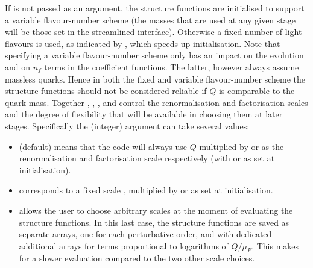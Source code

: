 If  is not passed as an argument, the structure functions
are initialised to support a variable flavour-number scheme (the
masses that are used at any given stage will be those set in the
streamlined interface).
%
Otherwise a fixed number of light flavours is used, as indicated by
, which speeds up initialisation.
%
Note that specifying a variable flavour-number scheme only has an
impact on the evolution and on $n_f$ terms in the coefficient
functions.
%
The latter, however always assume massless quarks.
%
Hence in both the fixed and variable flavour-number scheme the
structure functions should not be considered reliable if  $Q$ is comparable to the quark mass.
Together , , , and  control
the renormalisation and factorisation scales and the degree of
flexibility that will be available in choosing them at later stages.
%
Specifically the (integer) 
argument can take several values:
\begin{itemize}
\item {} (default) means that the code will always
  use $Q$ multiplied by  or  as the renormalisation
  and factorisation scale respectively (with  or  as
  set at initialisation).
\item {} corresponds to a fixed scale
  , multiplied by  or  as set at
  initialisation.
\item {} allows the user to choose
  arbitrary scales at the moment of evaluating the structure
  functions.
  In this last case, the structure functions are saved as separate arrays, 
  one for each perturbative order, and with dedicated additional arrays
  for terms proportional to logarithms of $Q/\mu_F$. 
  This makes for a slower evaluation compared to the two other
  scale choices.
\end{itemize}
%


